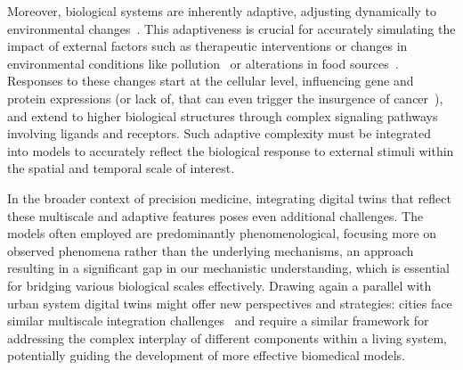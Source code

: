 \documentclass[12pt]{article}
\renewcommand{\(}{\left(}
\renewcommand{\)}{\right)}
\renewcommand{\[}{\left[}
\renewcommand{\]}{\right]}
\begin{document}
Moreover, biological systems are inherently adaptive, adjusting dynamically to environmental changes~\cite{freeman2001biocomplexity}. This adaptiveness is crucial for accurately simulating the impact of external factors such as therapeutic interventions or changes in environmental conditions like pollution~\cite{fuller2022pollution} or alterations in food sources~\cite{van2023deciphering,al2023microplastics}. Responses to these changes start at the cellular level, influencing gene and protein expressions (or lack of, that can even trigger the insurgence of cancer~\cite{Parreno2024}), and extend to higher biological structures through complex signaling pathways involving ligands and receptors. Such adaptive complexity must be integrated into models to accurately reflect the biological response to external stimuli within the spatial and temporal scale of interest.

In the broader context of precision medicine, integrating digital twins that reflect these multiscale and adaptive features poses even additional challenges. The models often employed are predominantly phenomenological, focusing more on observed phenomena rather than the underlying mechanisms, an approach resulting in a significant gap in our mechanistic understanding, which is essential for bridging various biological scales effectively. Drawing again a parallel with urban system digital twins might offer new perspectives and strategies: cities face similar multiscale integration challenges~\cite{caldarelli2023role} and require a similar framework for addressing the complex interplay of different components within a living system, potentially guiding the development of more effective biomedical models. 
\end{document}
